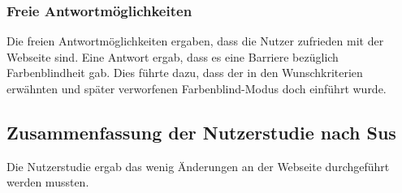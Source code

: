 \subsubsection{Freie Antwortmöglichkeiten}
Die freien Antwortmöglichkeiten ergaben, dass die Nutzer zufrieden mit der Webseite sind. 
Eine Antwort ergab, dass es eine Barriere bezüglich Farbenblindheit gab.
Dies führte dazu, dass der in den Wunschkriterien erwähnten und später verworfenen Farbenblind-Modus doch einführt wurde. 

\subsection{Zusammenfassung der Nutzerstudie nach Sus}

Die Nutzerstudie ergab das wenig Änderungen an der Webseite durchgeführt werden mussten.